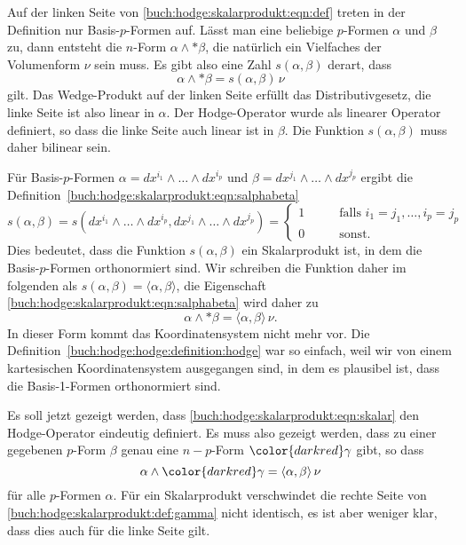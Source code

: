 Auf der linken Seite von \eqref{buch:hodge:skalarprodukt:eqn:def}
treten in der Definition nur Basis-$p$-Formen auf.
Lässt man eine beliebige $p$-Formen $\alpha$ und $\beta$ zu, dann
entsteht die $n$-Form $\alpha\wedge{\ast\beta}$, die natürlich ein
Vielfaches der Volumenform $\nu$ sein muss.
Es gibt also eine Zahl $s(\alpha,\beta)$ derart, dass
\begin{equation}
\alpha \wedge {\ast\beta} = s(\alpha,\beta)\,\nu
\label{buch:hodge:skalarprodukt:eqn:salphabeta}
\end{equation}
gilt.
Das Wedge-Produkt auf der linken Seite erfüllt das Distributivgesetz,
die linke Seite ist also linear in $\alpha$.
Der Hodge-Operator wurde als linearer Operator definiert, so dass 
die linke Seite auch linear ist in $\beta$.
Die Funktion $s(\alpha,\beta)$ muss daher bilinear sein.

Für Basis-$p$-Formen $\alpha=dx^{i_1}\wedge\dots\wedge dx^{i_p}$
und $\beta=dx^{j_1}\wedge\dots\wedge dx^{j_p}$ ergibt die
Definition~\eqref{buch:hodge:skalarprodukt:eqn:salphabeta}
\[
s(\alpha,\beta)
=
s(
dx^{i_1}\wedge\dots\wedge dx^{i_p},
dx^{j_1}\wedge\dots\wedge dx^{j_p}
)
=
\begin{cases}
1&\qquad\text{falls }i_1=j_1,\dots,i_p=j_p\\
0&\qquad\text{sonst.}
\end{cases}
\]
Dies bedeutet, dass die Funktion $s(\alpha,\beta)$ ein Skalarprodukt
ist, in dem die Basis-$p$-Formen orthonormiert sind.
Wir schreiben die Funktion daher im folgenden als
$s(\alpha,\beta)=\langle\alpha,\beta\rangle$, die Eigenschaft
\eqref{buch:hodge:skalarprodukt:eqn:salphabeta}
wird daher zu
\begin{equation}
\alpha\wedge {\ast\beta}
=
\langle\alpha,\beta\rangle\,\nu.
\label{buch:hodge:skalarprodukt:eqn:skalar}
\end{equation}
In dieser Form kommt das Koordinatensystem nicht mehr vor.
Die Definition~\ref{buch:hodge:hodge:definition:hodge}
war so einfach, weil wir von einem kartesischen Koordinatensystem
ausgegangen sind, in dem es plausibel ist, dass die Basis-1-Formen
orthonormiert sind.

Es soll jetzt gezeigt werden, dass
\eqref{buch:hodge:skalarprodukt:eqn:skalar}
den Hodge-Operator eindeutig definiert.
Es muss also gezeigt werden, dass zu einer gegebenen $p$-Form
$\beta$ genau eine $n-p$-Form ${\color{darkred}\gamma}$ gibt, so dass
\begin{equation}
\alpha\wedge {\color{darkred}\gamma}
=
\langle\alpha,\beta\rangle\,\nu
\label{buch:hodge:skalarprodukt:def:gamma}
\end{equation}
für alle $p$-Formen $\alpha$.
Für ein Skalarprodukt verschwindet die rechte
Seite von \eqref{buch:hodge:skalarprodukt:def:gamma}
nicht identisch, es ist aber weniger klar, dass dies auch für die
linke Seite gilt.


